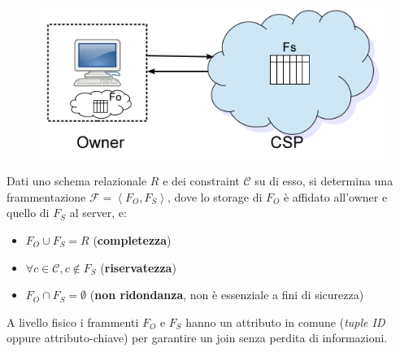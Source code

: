 \documentclass{report}
\begin{document}
\begin{figure}[ht]
    \centering
    \includegraphics[width=0.7\linewidth]{images/fragmentation/intro.png}
\end{figure}

Dati uno schema relazionale $R$ e dei constraint $\mathcal{C}$ su di esso, si 
determina una frammentazione $\mathcal{F} = \left\langle F_O, F_S \right\rangle$, dove lo storage di
$F_O$ è affidato all'owner e quello di $F_S$ al server, e:
\begin{itemize}
    \item $F_O \cup F_S = R$ (\textbf{completezza})
    \item $\forall c \in \mathcal{C}, c \notin F_S$ (\textbf{riservatezza})
    \item $F_O \cap F_S = \emptyset$ (\textbf{non ridondanza}, non è essenziale a fini di sicurezza)
\end{itemize}

A livello fisico i frammenti $F_O$ e $F_S$ hanno un attributo in comune (\textit{tuple ID} oppure attributo-chiave) 
per garantire un join senza perdita di informazioni. 
\end{document}
